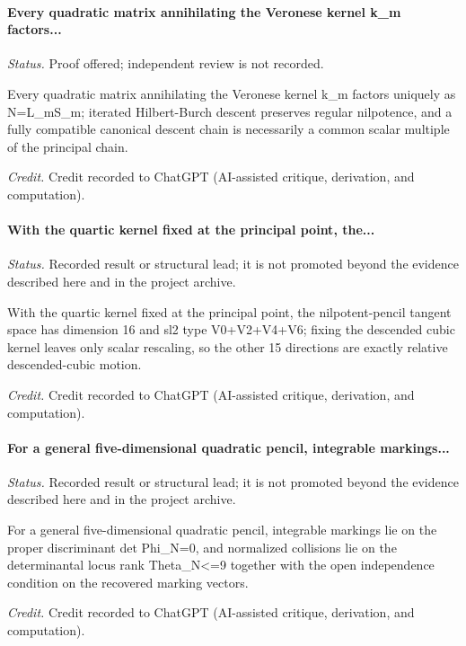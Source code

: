 \label{supp-note-05-032}
\paragraph{Every quadratic matrix annihilating the Veronese kernel k\_m factors...}
\emph{Status.} Proof offered; independent review is not recorded.

Every quadratic matrix annihilating the Veronese kernel k\_m factors uniquely as N=L\_mS\_m; iterated Hilbert-Burch descent preserves regular nilpotence, and a fully compatible canonical descent chain is necessarily a common scalar multiple of the principal chain.

\emph{Credit.} Credit recorded to ChatGPT (AI-assisted critique, derivation, and computation).

\label{supp-note-05-033}
\paragraph{With the quartic kernel fixed at the principal point, the...}
\emph{Status.} Recorded result or structural lead; it is not promoted beyond the evidence described here and in the project archive.

With the quartic kernel fixed at the principal point, the nilpotent-pencil tangent space has dimension 16 and sl2 type V0+V2+V4+V6; fixing the descended cubic kernel leaves only scalar rescaling, so the other 15 directions are exactly relative descended-cubic motion.

\emph{Credit.} Credit recorded to ChatGPT (AI-assisted critique, derivation, and computation).

\label{supp-note-05-034}
\paragraph{For a general five-dimensional quadratic pencil, integrable markings...}
\emph{Status.} Recorded result or structural lead; it is not promoted beyond the evidence described here and in the project archive.

For a general five-dimensional quadratic pencil, integrable markings lie on the proper discriminant det Phi\_N=0, and normalized collisions lie on the determinantal locus rank Theta\_N<=9 together with the open independence condition on the recovered marking vectors.

\emph{Credit.} Credit recorded to ChatGPT (AI-assisted critique, derivation, and computation).

